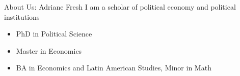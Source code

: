 \documentclass[11pt]{beamer}
\begin{document}

\begin{frame}[c]{About Us: Adriane Fresh}
	I am a scholar of political economy and political institutions \\
	\vspace{0.5cm}
	\begin{itemize}
		\pause \item PhD in Political Science
		\pause \item Master in Economics
		\pause \item BA in Economics and Latin American Studies, Minor in Math
	\end{itemize}
\end{frame}
\end{document}

